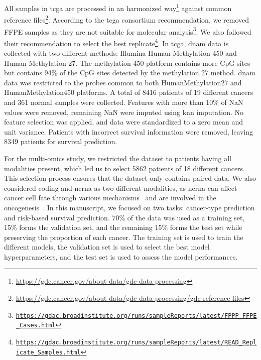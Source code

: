 \documentclass[../main.tex]{subfiles}
\begin{document}


		All samples in \gls{tcga} are processed in an harmonized way\footnote{\url{https://gdc.cancer.gov/about-data/gdc-data-processing}} against common reference files\footnote{\url{https://gdc.cancer.gov/about-data/gdc-data-processing/gdc-reference-files}}.
		According to the \gls{tcga} consortium recommendation, we removed FFPE samples as they are not suitable for molecular analysis\footnote{\href{https://web.archive.org/web/20150919082952/https://gdac.broadinstitute.org/runs/sampleReports/latest/FPPP_FFPE_Cases.html}{\nolinkurl{https://gdac.broadinstitute.org/runs/sampleReports/latest/FPPP\_FFPE\_Cases.html}}}.
		We also followed their recommendation to select the best replicate\footnote{\href{https://web.archive.org/web/20150919044554/http://gdac.broadinstitute.org/runs/sampleReports/latest/READ_Replicate_Samples.html}{\nolinkurl{https://gdac.broadinstitute.org/runs/sampleReports/latest/READ\_Replicate\_Samples.html}}}.
		In \gls{tcga}, \gls{dnam} data is collected with two different methods: Illumina Human Methylation 450 and Human Methylation 27.
		The methylation 450 platform contains more CpG sites but contains 94\% of the CpG sites detected by the methylation 27 method.
		\Gls{dnam} data was restricted to the probes common to both HumanMethylation27 and HumanMethylation450 platforms.
		A total of 8416 patients of 19 different cancers and 361 normal samples were collected.
		Features with more than 10\% of NaN values were removed, remaining NaN were imputed using \gls{knn} imputation.
		No feature selection was applied, and data were standardized to a zero mean and unit variance.
		Patients with incorrect survival information were removed, leaving 8349 patients for survival prediction.

		For the multi-omics study, we restricted the dataset to patients having all modalities present, which led us to select 5862 patients of 18 different cancers.
		This selection process ensures that the dataset only contains paired data.
		We also considered coding and \gls{ncrna} as two different modalities, as \gls{ncrna} can affect cancer cell fate through various mechanisms~\cite{Grillone2020} and are involved in the oncogenesis~\cite{Toden2021}.
		In this manuscript, we focused on two tasks: cancer-type prediction and risk-based survival prediction.
		70\% of the data was used as a training set, 15\% forms the validation set, and the remaining 15\% forms the test set while preserving the proportion of each cancer.
		The training set is used to train the different models, the validation set is used to select the best model hyperparameters, and the test set is used to assess the model performances.
\end{document}
